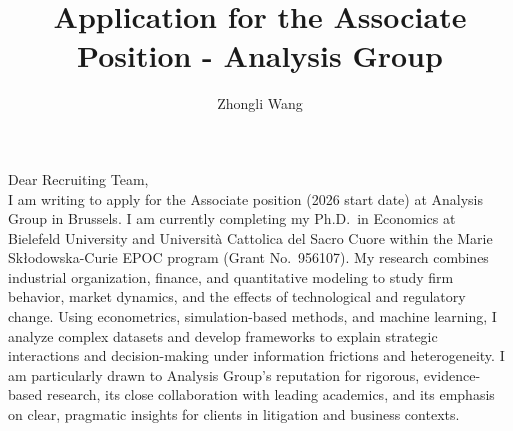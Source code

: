 \documentclass{nfr}
\title{Application for the Associate Position - Analysis Group}
\author{Zhongli Wang}
\begin{document}

% 
% 
% 
% 


\maketitle


\noindent Dear Recruiting Team,\\[0.2cm]

I am writing to apply for the Associate position (2026 start date) at Analysis Group in Brussels. 
I am currently completing my Ph.D.\ in Economics at Bielefeld University and Università Cattolica del Sacro Cuore within the Marie Skłodowska-Curie EPOC program (Grant No.~956107). 
My research combines industrial organization, finance, and quantitative modeling to study firm behavior, market dynamics, and the effects of technological and regulatory change. 
Using econometrics, simulation-based methods, and machine learning, I analyze complex datasets and develop frameworks to explain strategic interactions and decision-making under information frictions and heterogeneity. 
I am particularly drawn to Analysis Group’s reputation for rigorous, evidence-based research, its close collaboration with leading academics, and its emphasis on clear, pragmatic insights for clients in litigation and business contexts.\\
\end{document}
